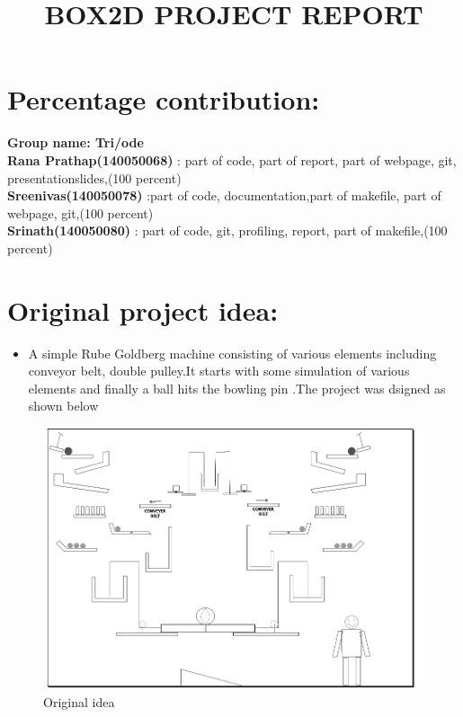 \documentclass[10pt,a4paper]{article}
\title{BOX2D PROJECT REPORT}
\begin{document}
\maketitle
\section*{\textbf{Percentage contribution:}}
\textbf{Group name: Tri/ode}\\
\textbf{Rana Prathap(140050068)} : part of code, part of report, part of webpage,
git, presentationslides,(100 percent)\\
\textbf{Sreenivas(140050078)} :part of code, documentation,part of makefile, part of
webpage, git,(100 percent)\\
\textbf{Srinath(140050080)} : part of code, git, profiling, report, part of makefile,(100 percent)\\ 

 

\section*{\textbf{Original project idea:}}

\begin{itemize}[itemsep = -0.75 mm, leftmargin=*]
\item  A simple Rube Goldberg machine consisting of various elements
including conveyor belt, double pulley.It starts with some simulation of various elements and finally a ball
hits the bowling pin .The project was dsigned as shown below
\end{itemize}

\begin{figure}[!htb]
\begin{center}
\includegraphics[width=1.0\textwidth]{outline.png}
\end{center}
\caption{Original idea}
\end{figure}
\end{document}

